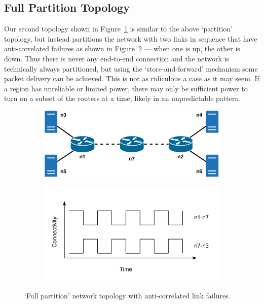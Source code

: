 \documentclass[withindex,glossary,openany]{cam-thesis}
\begin{document}
\subsection{Full Partition Topology}

Our second topology shown in Figure~\ref{fig:full_partition_topology} is similar to the above `partition' topology, but instead partitions the network with two links in sequence that have anti-correlated failures as shown in Figure~\ref{fig:full_partition_graph} --- when one is up, the other is down. Thus there is never any end-to-end connection and the network is technically always partitioned, but using the `store-and-forward' mechanism some packet delivery can be achieved. This is not as ridiculous a case as it may seem. If a region has unreliable or limited power, there may only be sufficient power to turn on a subset of the routers at a time, likely in an unpredictable pattern.

\begin{figure}[H]
\centering
\begin{subfigure}{.65\textwidth}
  \centering
  \includegraphics[width=1\linewidth]{delay_full_partition_topology}
  \caption{}
  \label{fig:full_partition_topology}
\end{subfigure}

\begin{subfigure}{.65\textwidth}
  \centering
  \includegraphics[width=1\linewidth]{delay_full_partition_graph}
  \caption{}
  \label{fig:full_partition_graph}
\end{subfigure}
\caption{`Full partition' network topology with anti-correlated link failures.}
\label{fig:full_partition}
\end{figure}
\end{document}
